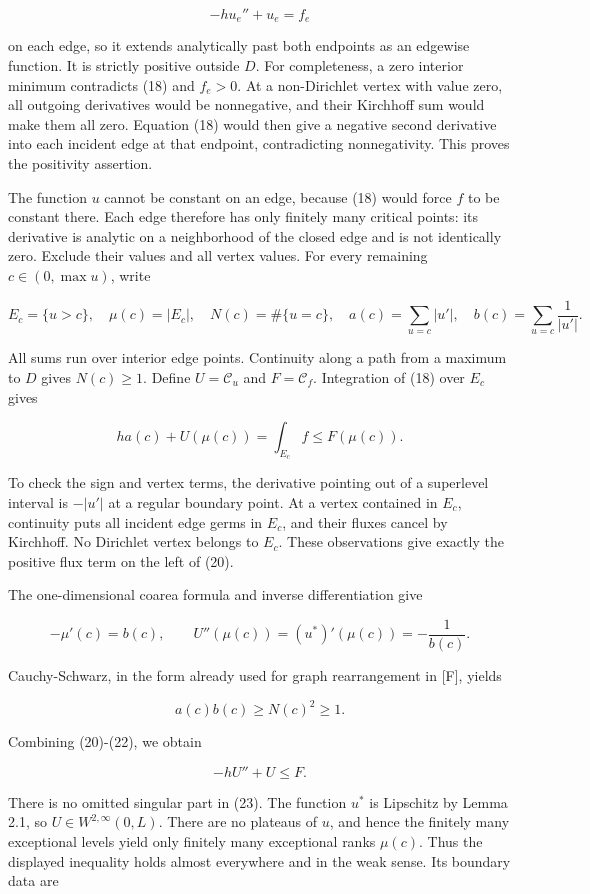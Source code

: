 \documentclass[11pt]{article}
\begin{document}
\[
-hu_e''+u_e=f_e
\tag{18}
\]

on each edge, so it extends analytically past both endpoints as an
edgewise function. It is strictly positive outside \(D\). For
completeness, a zero interior minimum contradicts (18) and \(f_e>0\). At
a non-Dirichlet vertex with value zero, all outgoing derivatives would
be nonnegative, and their Kirchhoff sum would make them all zero.
Equation (18) would then give a negative second derivative into each
incident edge at that endpoint, contradicting nonnegativity. This proves
the positivity assertion.

The function \(u\) cannot be constant on an edge, because (18) would
force \(f\) to be constant there. Each edge therefore has only finitely
many critical points: its derivative is analytic on a neighborhood of
the closed edge and is not identically zero. Exclude their values and
all vertex values. For every remaining \(c\in(0,\max u)\), write

\[
E_c=\{u>c\},\quad \mu(c)=|E_c|,\quad
N(c)=\#\{u=c\},
\quad a(c)=\sum_{u=c}|u'|,\quad
b(c)=\sum_{u=c}\frac1{|u'|}.
\tag{19}
\]

All sums run over interior edge points. Continuity along a path from a
maximum to \(D\) gives \(N(c)\ge1\). Define \(U=\mathcal C_u\) and
\(F=\mathcal C_f\). Integration of (18) over \(E_c\) gives

\[
ha(c)+U(\mu(c))=\int_{E_c}f\le F(\mu(c)).
\tag{20}
\]

To check the sign and vertex terms, the derivative pointing out of a
superlevel interval is \(-|u'|\) at a regular boundary point. At a
vertex contained in \(E_c\), continuity puts all incident edge germs in
\(E_c\), and their fluxes cancel by Kirchhoff. No Dirichlet vertex
belongs to \(E_c\). These observations give exactly the positive flux
term on the left of (20).

The one-dimensional coarea formula and inverse differentiation give

\[
-\mu'(c)=b(c),\qquad
U''(\mu(c))=(u^*)'(\mu(c))=-\frac1{b(c)}.
\tag{21}
\]

Cauchy-Schwarz, in the form already used for graph rearrangement in
{[}F{]}, yields

\[
a(c)b(c)\ge N(c)^2\ge1.
\tag{22}
\]

Combining (20)-(22), we obtain

\[
-hU''+U\le F.
\tag{23}
\]

There is no omitted singular part in (23). The function \(u^*\) is
Lipschitz by Lemma 2.1, so \(U\in W^{2,\infty}(0,L)\). There are no
plateaus of \(u\), and hence the finitely many exceptional levels yield
only finitely many exceptional ranks \(\mu(c)\). Thus the displayed
inequality holds almost everywhere and in the weak sense. Its boundary
data are
\end{document}
